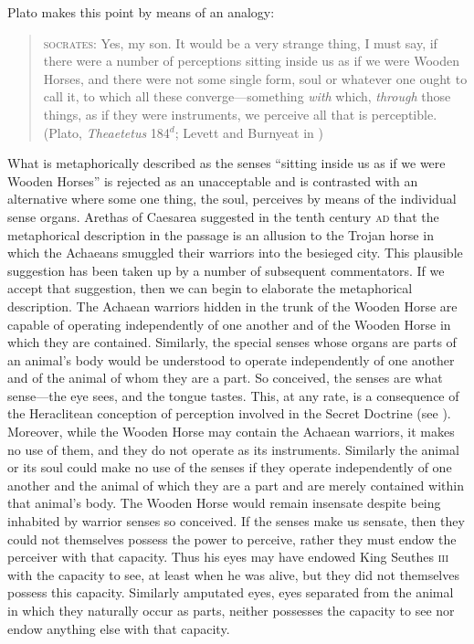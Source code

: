 Plato makes this point by means of an analogy: 
\begin{quote}
	\textsc{socrates}: Yes, my son. It would be a very strange thing, I must say, if there were a number of perceptions sitting inside us as if we were Wooden Horses, and there were not some single form, soul or whatever one ought to call it, to which all these converge---something \emph{with} which, \emph{through} those things, as if they were instruments, we perceive all that is perceptible. (Plato, \emph{Theaetetus} 184\( ^{d} \); Levett and Burnyeat in \citealt[204]{Cooper:1997fk})
\end{quote}
What is metaphorically described as the senses ``sitting inside us as if we were Wooden Horses'' is rejected as an unacceptable and is contrasted with an alternative where some one thing, the soul, perceives by means of the individual sense organs. Arethas of Caesarea suggested in the tenth century \textsc{ad} that the metaphorical description in the passage is an allusion to the Trojan horse in which the Achaeans smuggled their warriors into the besieged city. This plausible suggestion has been taken up by a number of subsequent commentators. If we accept that suggestion, then we can begin to elaborate the metaphorical description. The Achaean warriors hidden in the trunk of the Wooden Horse are capable of operating independently of one another and of the Wooden Horse in which they are contained. Similarly, the special senses whose organs are parts of an animal's body would be understood to operate independently of one another and of the animal of whom they are a part. So conceived, the senses are what sense---the eye sees, and the tongue tastes. This, at any rate, is a consequence of the Heraclitean conception of perception involved in the Secret Doctrine (see \citealt[30--31]{Burnyeat:1976ab}). Moreover, while the Wooden Horse may contain the Achaean warriors, it makes no use of them, and they do not operate as its instruments. Similarly the animal or its soul could make no use of the senses if they operate independently of one another and the animal of which they are a part and are merely contained within that animal's body. The Wooden Horse would remain insensate despite being inhabited by warrior senses so conceived. If the senses make us sensate, then they could not themselves possess the power to perceive, rather they must endow the perceiver with that capacity. Thus his eyes may have endowed King Seuthes \textsc{iii} with the capacity to see, at least when he was alive, but they did not themselves possess this capacity. Similarly amputated eyes, eyes separated from the animal in which they naturally occur as parts, neither possesses the capacity to see nor endow anything else with that capacity. 

